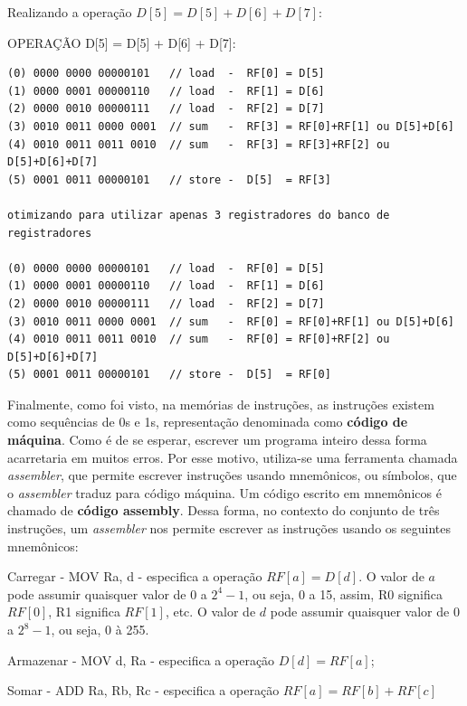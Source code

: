 \documentclass{article}
\begin{document}
Realizando a operação $D[5]=D[5]+D[6]+D[7]$:


\begin{boxedd}{OPERAÇÃO D[5] = D[5] + D[6] + D[7]:}
     \begin{lstlisting}
(0) 0000 0000 00000101   // load  -  RF[0] = D[5] 
(1) 0000 0001 00000110   // load  -  RF[1] = D[6] 
(2) 0000 0010 00000111   // load  -  RF[2] = D[7] 
(3) 0010 0011 0000 0001  // sum   -  RF[3] = RF[0]+RF[1] ou D[5]+D[6]
(4) 0010 0011 0011 0010  // sum   -  RF[3] = RF[3]+RF[2] ou D[5]+D[6]+D[7]
(5) 0001 0011 00000101   // store -  D[5]  = RF[3]

otimizando para utilizar apenas 3 registradores do banco de registradores

(0) 0000 0000 00000101   // load  -  RF[0] = D[5] 
(1) 0000 0001 00000110   // load  -  RF[1] = D[6] 
(2) 0000 0010 00000111   // load  -  RF[2] = D[7] 
(3) 0010 0011 0000 0001  // sum   -  RF[0] = RF[0]+RF[1] ou D[5]+D[6]
(4) 0010 0011 0011 0010  // sum   -  RF[0] = RF[0]+RF[2] ou D[5]+D[6]+D[7]
(5) 0001 0011 00000101   // store -  D[5]  = RF[0]
     \end{lstlisting}    
\end{boxedd}


Finalmente, como foi visto, na memórias de instruções, as instruções existem como sequências de 0s e 1s, representação denominada como \textbf{código de máquina}. Como é de se esperar, escrever um programa inteiro dessa forma acarretaria em muitos erros. Por esse motivo, utiliza-se uma ferramenta chamada \textit{assembler}, que permite escrever instruções usando mnemônicos, ou símbolos, que o \textit{assembler} traduz para código máquina. Um código escrito em mnemônicos é chamado de \textbf{código assembly}.
Dessa forma, no contexto do conjunto de três instruções, um \textit{assembler} nos permite escrever as instruções usando os seguintes mnemônicos:

\begin{boxlabel}
     \item Carregar - MOV Ra, d - especifica a operação $RF[a] = D[d]$. O valor de $a$ pode assumir quaisquer valor de 0 a $2^{4}-1$, ou seja, 0 a 15, assim, R0 significa $RF[0]$, R1 significa $RF[1]$, etc. O valor de $d$ pode assumir quaisquer valor de 0 a $2^{8}-1$, ou seja, 0 à 255.
     \item Armazenar - MOV d, Ra - especifica a operação $D[d]=RF[a]$;
     \item Somar - ADD Ra, Rb, Rc - especifica a operação $RF[a]=RF[b]+RF[c]$
\end{boxlabel}
\end{document}
